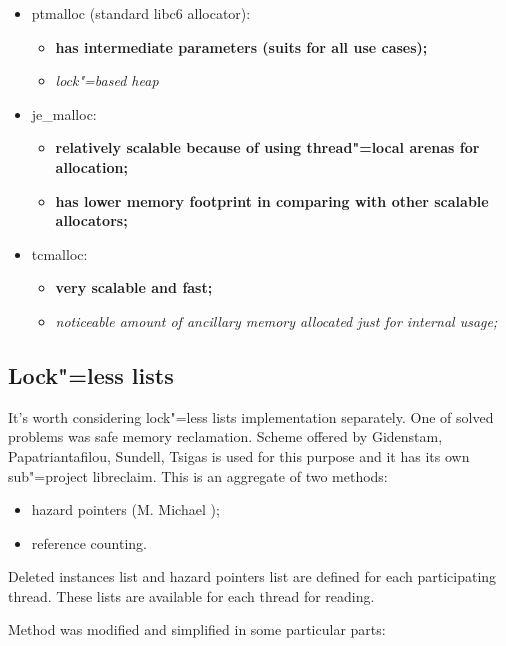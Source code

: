 \documentclass[10pt, a5paper]{article}
\begin{document}
\begin{itemize}
  \item ptmalloc (standard libc6 allocator):\begin{itemize}
  \item \textbf{has intermediate parameters (suits for all use cases);}
  \item \emph{lock"=based heap}
\end{itemize}
  \item je\_malloc:\begin{itemize}
  \item \textbf{relatively scalable because of using thread"=local \linebreak arenas for allocation;}
  \item \textbf{has lower memory footprint in comparing with other scalable allocators;}
\end{itemize}
  \item tcmalloc:\begin{itemize}
  \item \textbf{very scalable and fast;}
  \item \emph{noticeable amount of ancillary memory allocated just for \linebreak internal usage;}
\end{itemize}
\end{itemize}

\subsection*{Lock"=less lists}

It's worth considering lock"=less lists implementation separately. One of solved problems was safe memory reclamation. Scheme offered by Gidenstam, Papatriantafilou, Sundell, Tsigas \cite{Matyl1} is used for this purpose and it has its own sub"=project libreclaim. This is an aggregate of two methods:

\begin{itemize}
  \item hazard pointers (M. Michael \cite{Matyl2});
  \item reference counting.
\end{itemize}

Deleted instances list and hazard pointers list are defined for each participating thread. These lists are available for each thread for reading.

Method was modified and simplified in some particular parts:
\end{document}
